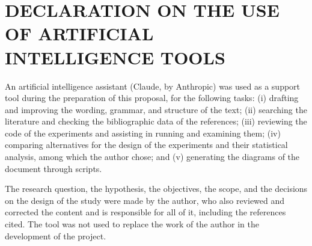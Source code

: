 \documentclass[12pt,a4paper,oneside]{report}
\begin{document}












\newpage

\newpage
\chapter*{\centering \large DECLARATION ON THE USE OF ARTIFICIAL INTELLIGENCE TOOLS}

An artificial intelligence assistant (Claude, by Anthropic) was used as a support tool during the preparation of this proposal, for the following tasks: (i) drafting and improving the wording, grammar, and structure of the text; (ii) searching the literature and checking the bibliographic data of the references; (iii) reviewing the code of the experiments and assisting in running and examining them; (iv) comparing alternatives for the design of the experiments and their statistical analysis, among which the author chose; and (v) generating the diagrams of the document through scripts.

The research question, the hypothesis, the objectives, the scope, and the decisions on the design of the study were made by the author, who also reviewed and corrected the content and is responsible for all of it, including the references cited. The tool was not used to replace the work of the author in the development of the project.



\appendix
\renewcommand{\appendixname}{Annex}
\renewcommand{\thetable}{\Alph{chapter}.\arabic{table}} %
\renewcommand{\thefigure}{\Alph{chapter}.\arabic{figure}}

\end{document}
